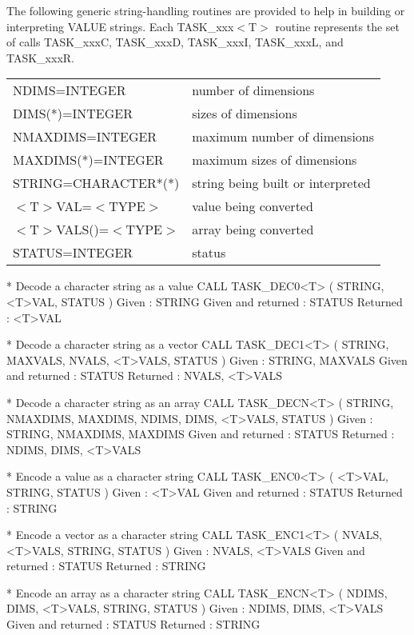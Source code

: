 \documentclass[twoside,11pt,nolof]{starlink}
\begin{document}
The following generic string-handling routines are provided to help in
building or interpreting VALUE strings. Each TASK\_xxx$<$T$>$ routine
represents the set of calls TASK\_xxxC, TASK\_xxxD, TASK\_xxxI, TASK\_xxxL,
and TASK\_xxxR.

\begin{small}
\begin{center}
\begin{tabular}{ll}
NDIMS=INTEGER            &    number of dimensions \\
DIMS(*)=INTEGER          &    sizes of dimensions \\
NMAXDIMS=INTEGER         &    maximum number of dimensions \\
MAXDIMS(*)=INTEGER       &    maximum sizes of dimensions \\
STRING=CHARACTER*(*)     &    string being built or interpreted \\
$<$T$>$VAL=$<$TYPE$>$    &    value being converted \\
$<$T$>$VALS()=$<$TYPE$>$ &    array being converted \\
STATUS=INTEGER           &    status \\
\end{tabular}
\end{center}
\end{small}

\begin{terminalv}
*  Decode a character string as a value
CALL TASK_DEC0<T> ( STRING, <T>VAL, STATUS )
Given : STRING
Given and returned : STATUS
Returned : <T>VAL
\end{terminalv}
\newpage
\begin{terminalv}
*  Decode a character string as a vector
CALL TASK_DEC1<T> ( STRING, MAXVALS, NVALS, <T>VALS, STATUS )
Given : STRING, MAXVALS
Given and returned : STATUS
Returned : NVALS, <T>VALS

*  Decode a character string as an array
CALL TASK_DECN<T> ( STRING, NMAXDIMS, MAXDIMS, NDIMS, DIMS, <T>VALS, STATUS )
Given : STRING, NMAXDIMS, MAXDIMS
Given and returned : STATUS
Returned : NDIMS, DIMS, <T>VALS

*  Encode a value as a character string
CALL TASK_ENC0<T> ( <T>VAL, STRING, STATUS )
Given : <T>VAL
Given and returned : STATUS
Returned : STRING

*  Encode a vector as a character string
CALL TASK_ENC1<T> ( NVALS, <T>VALS, STRING, STATUS )
Given : NVALS, <T>VALS
Given and returned : STATUS
Returned : STRING

*  Encode an array as a character string
CALL TASK_ENCN<T> ( NDIMS, DIMS, <T>VALS, STRING, STATUS )
Given : NDIMS, DIMS, <T>VALS
Given and returned : STATUS
Returned : STRING
\end{terminalv}
\end{document}
